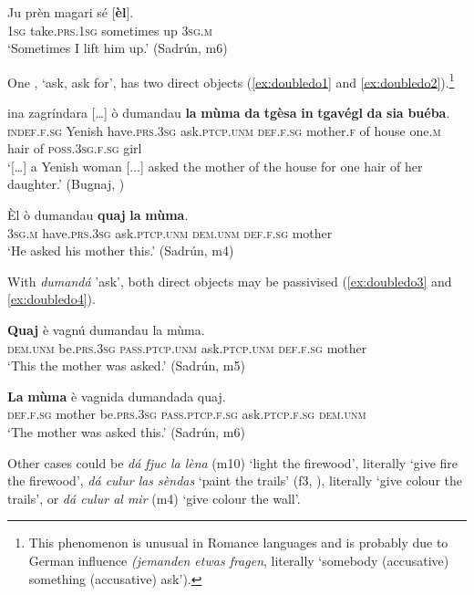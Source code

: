 \ea
\label{ex:do4}
\gll  Ju prèn magari sé [\textbf{èl}].\\
\textsc{1sg} take.\textsc{prs.1sg} sometimes up \textsc{3sg.m}\\
\glt `Sometimes I lift him up.' (Sadrún, m6)
\z

One ,  `ask, ask for', has two direct objects (\ref{ex:doubledo1} and \ref{ex:doubledo2}).\footnote{This phenomenon is unusual in Romance languages and is probably due to German influence \textit{(jemanden etwas fragen}, literally `somebody (accusative) something (accusative) ask').}

\ea
\label{ex:doubledo1}
\gll  [...]  ina zagríndara […] ò dumandau {\ob}\textbf{la} \textbf{mùma} \textbf{da} \textbf{tgèsa}{\cb} {\ob}\textbf{in} \textbf{tgavégl} \textbf{da} \textbf{sia} \textbf{buéba}{\cb}. \\
{} \textsc{indef.f.sg} Yenish {} have.\textsc{prs.3sg}   ask.\textsc{ptcp.unm} \textsc{def.f.sg} mother.\textsc{f} of house one.\textsc{m} hair of \textsc{poss.3sg.f.sg} girl \\
\glt `[…] a Yenish woman [...] asked the mother of the house for one hair of her daughter.' (Bugnaj, \citealt[131]{Büchli1966})
\z

\ea
\label{ex:doubledo2}
\gll Èl ò dumandau {\ob}{\textbf{quaj}}{\cb} {\ob}{\textbf{la}} {\textbf{mùma}}{\cb}.\\
\textsc{3sg.m}  have\textsc{.prs.3sg} ask.\textsc{ptcp.unm} \textsc{dem.unm} \textsc{def.f.sg} mother\\
\glt `He asked his mother this.' (Sadrún, m4)
\z

With \textit{dumandá} 'ask', both direct objects may be passivised (\ref{ex:doubledo3} and \ref{ex:doubledo4}).

\ea
\label{ex:doubledo3}
\gll {\ob}\textbf{Quaj}{\cb} è vagnú dumandau la mùma.\\
 \textsc{dem.unm} be.\textsc{prs.3sg} \textsc{ pass.ptcp.unm} ask.\textsc{ptcp.unm} \textsc{def.f.sg} mother\\
\glt `This the mother was asked.' (Sadrún, m5)
\z

\ea
\label{ex:doubledo4}
\gll {\ob}\textbf{La} \textbf{mùma}{\cb} è vagnida dumandada quaj. \\
\textsc{def.f.sg} mother be.\textsc{prs.3sg} \textsc{pass.ptcp.f.sg} ask.\textsc{ptcp.f.sg} \textsc{dem.unm}\\
\glt `The mother was asked this.' (Sadrún, m6)
\z


Other cases could be \textit{dá fjuc la lèna} (m10) `light the firewood', literally `give fire the firewood',  \textit{dá culur las sèndas} `paint  the trails' (f3, ), literally `give colour the trails', or \textit{dá culur al mir} (m4) `give colour the wall'.

